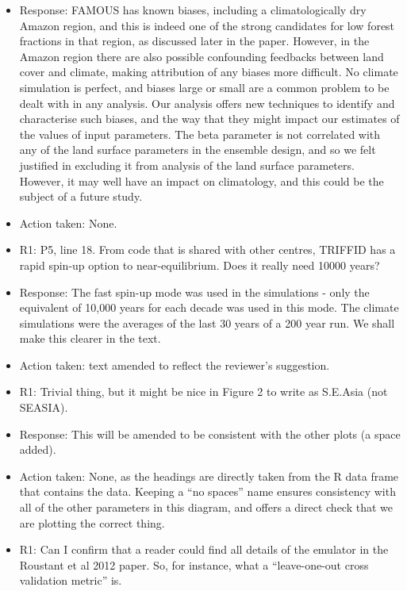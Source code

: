 \documentclass[esd, manuscript]{copernicus}
\begin{document}
\begin{itemize}
\item{Response: FAMOUS has known biases, including a climatologically dry Amazon region, and this is indeed one of the strong candidates for low forest fractions in that region, as discussed later in the paper. However, in the Amazon region there are also possible confounding feedbacks between land cover and climate, making attribution of any biases more difficult. No climate simulation is perfect, and biases large or small are a common problem to be dealt with in any analysis. Our analysis offers new techniques to identify and characterise such biases, and the way that they might impact our estimates of the values of input parameters. The beta parameter is not correlated with any of the land surface parameters in the ensemble design, and so we felt justified in excluding it from analysis of the land surface parameters. However, it may well have an impact on climatology, and this could be the subject of a future study.}

\item{Action taken: None.}

\item{R1: P5, line 18. From code that is shared with other centres, TRIFFID has a rapid spin-up option to near-equilibrium. Does it really need 10000 years?}

\item{Response: The fast spin-up mode was used in the simulations - only the equivalent of 10,000 years for each decade was used in this mode. The climate simulations were the averages of the last 30 years of a 200 year run. We shall make this clearer in the text.}

\item{Action taken: text amended to reflect the reviewer's suggestion.}

\item{R1: Trivial thing, but it might be nice in Figure 2 to write as S.E.Asia (not SEASIA).}

\item{Response: This will be amended to be consistent with the other plots (a space added).}

\item{Action taken: None, as the headings are directly taken from the R data frame that contains the data. Keeping a ``no spaces'' name ensures consistency with all of the other parameters in this diagram, and offers a direct check that we are plotting the correct thing.}

\item{R1: Can I confirm that a reader could find all details of the emulator in the Roustant et al 2012 paper. So, for instance, what a ``leave-one-out cross validation metric'' is. }


\end{itemize}
\end{document}
